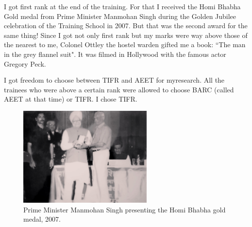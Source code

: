 I got first rank at the end of the training. For that I received the 
Homi Bhabha Gold medal from Prime Minister Manmohan Singh during the 
Golden Jubilee celebration of the Training School in 2007. But that was 
the second award for the same thing! Since I got not only first rank but 
my marks were way above those of the nearest to me, Colonel Ottley the 
hostel warden gifted me a book: ``The man in the grey flannel suit". It 
was filmed in Hollywood with the famous actor Gregory Peck.
 
I got freedom to choose between TIFR and AEET for my\break research. All the 
trainees who were above a certain rank were allowed to choose BARC 
(called AEET at that time) or TIFR. I chose TIFR.
\smallskip

\begin{figure}[H]
\centering
\includegraphics[width=0.6\textwidth]{images/Rajaji-04.jpg}
\caption{\small{Prime Minister Manmohan Singh presenting the Homi Bhabha
gold medal, 2007.}}
\end{figure}

